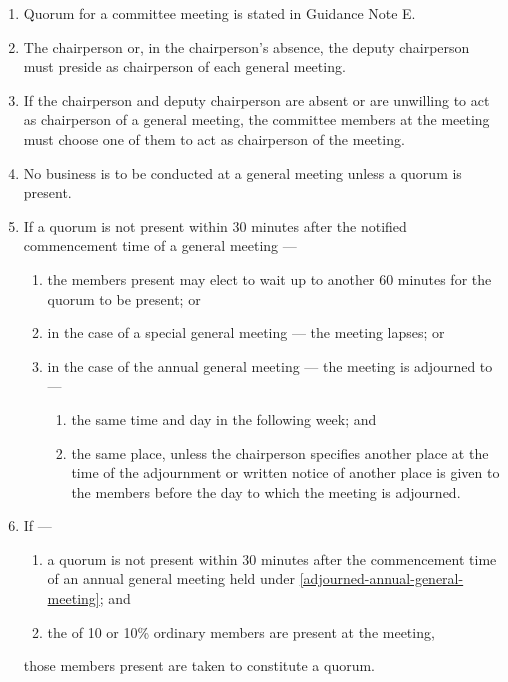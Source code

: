 \documentclass[../constitution.tex]{subfiles}
\begin{document}
\begin{enumerate}

\item Quorum for a committee meeting is stated in Guidance Note E. 
\item The chairperson or, in the chairperson's absence, the deputy chairperson must preside as chairperson of each general meeting.
\item If the chairperson and deputy chairperson are absent or are unwilling to act as chairperson of a general meeting, the committee members at the meeting must choose one of them to act as chairperson of the meeting.
\item No business is to be conducted at a general meeting unless a quorum is present.
\item If a quorum is not present within 30 minutes after the notified commencement time of a general meeting ---

  \begin{enumerate}
  
  \item the members present may elect to wait up to another 60 minutes for the quorum to be present; or 
  \item in the case of a special general meeting --- the meeting lapses; or
  \item in the case of the annual general meeting --- the meeting is adjourned to --- \label{adjourned-annual-general-meeting}

    \begin{enumerate}
    
    \item the same time and day in the following week; and
    \item the same place, unless the chairperson specifies another place at the time of the adjournment or written notice of another place is given to the members before the day to which the meeting is adjourned.
    \end{enumerate}
  \end{enumerate}
\item If ---

  \begin{enumerate}
  
  \item a quorum is not present within 30 minutes after the commencement time of an annual general meeting held under  \ref{adjourned-annual-general-meeting}; and
  \item the  of 10 or 10\% ordinary members are present at the meeting, 
  \end{enumerate}
  those members present are taken to constitute a quorum.
\end{enumerate}
\end{document}
